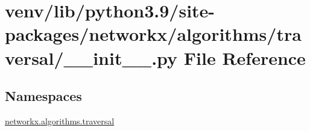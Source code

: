 \hypertarget{venv_2lib_2python3_89_2site-packages_2networkx_2algorithms_2traversal_2____init_____8py}{}\section{venv/lib/python3.9/site-\/packages/networkx/algorithms/traversal/\+\_\+\+\_\+init\+\_\+\+\_\+.py File Reference}
\label{venv_2lib_2python3_89_2site-packages_2networkx_2algorithms_2traversal_2____init_____8py}
\subsection*{Namespaces}
\begin{DoxyCompactItemize}
\item 
 \hyperlink{namespacenetworkx_1_1algorithms_1_1traversal}{networkx.\+algorithms.\+traversal}
\end{DoxyCompactItemize}
